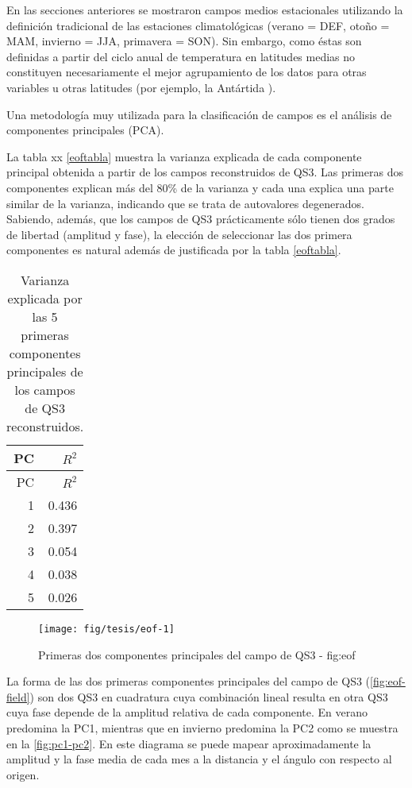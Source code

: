 \documentclass[spanish,a4paper]{book}
\begin{document}
En las secciones anteriores se mostraron campos medios estacionales
utilizando la definición tradicional de las estaciones climatológicas
(verano = DEF, otoño = MAM, invierno = JJA, primavera = SON). Sin
embargo, como éstas son definidas a partir del ciclo anual de
temperatura en latitudes medias no constituyen necesariamente el mejor
agrupamiento de los datos para otras variables u otras latitudes (por
ejemplo, la Antártida ).

Una metodología muy utilizada para la clasificación de campos es el
análisis de componentes principales
(PCA).

La tabla xx \ref{eoftabla} muestra la
varianza explicada de cada componente principal obtenida a partir de los
campos reconstruidos de QS3. Las primeras dos componentes explican más
del 80\% de la varianza y cada una explica una parte similar de la
varianza, indicando que se trata de autovalores
degenerados. Sabiendo, además, que los campos
de QS3 prácticamente sólo tienen dos grados de libertad (amplitud y
fase), la elección de seleccionar las dos primera componentes es natural
además de justificada por la tabla \ref{eoftabla}.

\begin{longtable}[]{@{}rr@{}}
\caption{Varianza explicada por las 5 primeras componentes principales
de los campos de QS3 reconstruidos.}\tabularnewline
\toprule
PC & \(R^2\)\tabularnewline
\midrule
\endfirsthead
\toprule
PC & \(R^2\)\tabularnewline
\midrule
\endhead
1 & 0.436\tabularnewline
2 & 0.397\tabularnewline
3 & 0.054\tabularnewline
4 & 0.038\tabularnewline
5 & 0.026\tabularnewline
\bottomrule
\end{longtable}

\begin{figure*}
\texttt{[image: fig/tesis/eof-1]} \caption{Primeras dos componentes principales del campo de QS3 - fig:eof}\label{fig:eof}
\end{figure*}

La forma de las dos primeras componentes principales del campo de QS3
(\autoref{fig:eof-field}) son dos QS3 en cuadratura cuya combinación
lineal resulta en otra QS3 cuya fase depende de la amplitud relativa de
cada componente. En verano predomina la PC1, mientras que en invierno
predomina la PC2 como se muestra en la \autoref{fig:pc1-pc2}. En este
diagrama se puede mapear aproximadamente la amplitud y la fase media de
cada mes a la distancia y el ángulo con respecto al origen.
\end{document}
